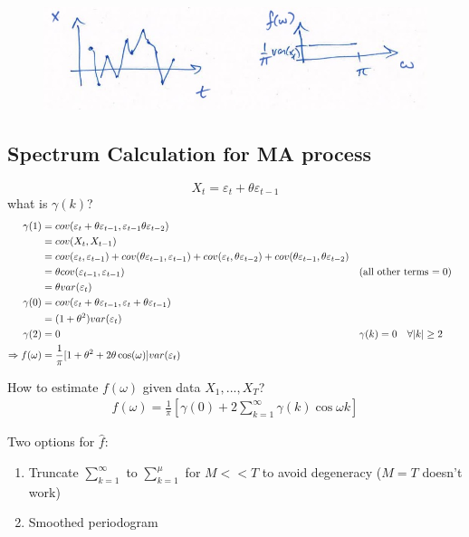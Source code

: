 \begin{figure}[H]
\includegraphics[scale=0.4]{images/Screenshot 2024-04-29 at 08.42.56.jpg}
\centering
\end{figure}



\subsection{Spectrum Calculation for MA process}
\[X_t=\varepsilon_t + \theta \varepsilon_{t-1}\]
what is $\gamma(k)$?
\begin{align*}
    \gamma(1)&=cov(\varepsilon_t+\theta \varepsilon_{t-1}, \varepsilon_{t-1} \theta \varepsilon_{t-2}) \\
    &= cov(X_t, X_{t-1})\\
    &= cov(\varepsilon_{t}, \varepsilon_{t-1})+cov(\theta \varepsilon_{t-1}, \varepsilon_{t-1}) + cov(\varepsilon_{t}, \theta \varepsilon_{t-2})+cov(\theta \varepsilon_{t-1}, \theta \varepsilon_{t-2})\\
    &= \theta cov(\varepsilon_{t-1},\varepsilon_{t-1}) &&\text{(all other terms $=0$)}\\
    &= \theta var(\varepsilon_{t})\\
    \gamma(0)&= cov(\varepsilon_{t} + \theta \varepsilon_{t-1}, \varepsilon_{t} + \theta \varepsilon_{t-1}) \\
    &= (1+\theta^2)var(\varepsilon_{t}) \\
    \gamma(2)&=0 &&{\gamma(k)=0 \text{\quad} \forall |k|\geq 2 } \\
    \Rightarrow f(\omega) &= \frac{1}{\pi} [ 1 + \theta^2 + 2 \theta \cos(\omega) ]var(\varepsilon_t)
\end{align*}

How to estimate $f(\omega)$ given data $X_1,...,X_T$?
\begin{align*}
    f(\omega) =\frac{1}{\pi} [ \gamma(0) + 2\sum_{k=1}^\infty \gamma(k) \cos \omega k] 
\end{align*}

Two options for $\hat{f}$: 
\begin{enumerate}
    \item Truncate $\sum_{k=1}^\infty$ to $\sum_{k=1}^\mu$ for $M<<T$ to avoid degeneracy ($M=T$ doesn't work)
    \item Smoothed periodogram
\end{enumerate}

